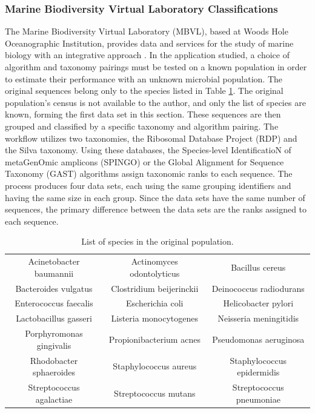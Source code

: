 \subsubsection{Marine Biodiversity Virtual Laboratory Classifications} \label{sec:MBVL}

The Marine Biodiversity Virtual Laboratory (MBVL), based at Woods Hole Oceanographic Institution, provides data and services for the study of marine biology with an integrative approach \cite{mbvl}.
In the application studied, a choice of algorithm and taxonomy pairings must be tested on a known population in order to estimate their performance with an unknown microbial population.
The original sequences belong only to the species listed in Table \ref{species_table}.
The original population's census is not available to the author, and only the list of species are known, forming the first data set in this section.
These sequences are then grouped and classified by a specific taxonomy and algorithm pairing.
The workflow utilizes two taxonomies, the Ribosomal Database Project (RDP) and the Silva taxonomy.
Using these databases, the Species-level IdentificatioN of metaGenOmic amplicons (SPINGO) or the Global Alignment for Sequence Taxonomy (GAST) algorithms assign taxonomic ranks to each sequence.
The process produces four data sets, each using the same grouping identifiers and having the same size in each group.
Since the data sets have the same number of sequences, the primary difference between the data sets are the ranks assigned to each sequence.

\begin{table}
	\caption{List of species in the original population.}
	\label{species_table}
	\centering
	\setlength{\tabcolsep}{2pt}
	\begin{tabular}{|c|c|c|}
		\hline
		Acinetobacter baumannii & Actinomyces odontolyticus & Bacillus cereus \\
		Bacteroides vulgatus & Clostridium beijerinckii & Deinococcus radiodurans \\
		Enterococcus faecalis & Escherichia coli & Helicobacter pylori \\
		Lactobacillus gasseri & Listeria monocytogenes & Neisseria meningitidis\\
		Porphyromonas gingivalis & Propionibacterium acnes & Pseudomonas aeruginosa \\
		Rhodobacter sphaeroides & Staphylococcus aureus & Staphylococcus epidermidis\\
		Streptococcus agalactiae & Streptococcus mutans & Streptococcus pneumoniae \\
		\hline
	\end{tabular}
\end{table}

